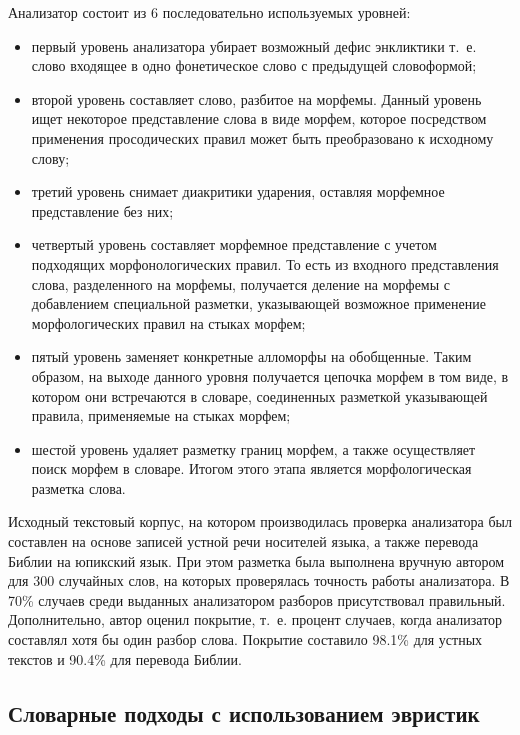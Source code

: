 Анализатор состоит из 6 последовательно используемых уровней:
\begin{itemize}
	\item первый уровень анализатора убирает возможный дефис энкликтики т.~е. слово входящее в одно фонетическое слово с предыдущей словоформой;
	\item второй уровень составляет слово, разбитое на морфемы. Данный уровень ищет некоторое представление слова в виде морфем, которое посредством применения просодических правил может быть преобразовано к исходному слову;
	\item третий уровень снимает диакритики ударения, оставляя морфемное представление без них;
	\item четвертый уровень составляет морфемное представление с учетом подходящих морфонологических правил. То есть из входного представления слова, разделенного на морфемы, получается деление на морфемы с добавлением специальной разметки, указывающей возможное применение морфологических правил на стыках морфем;
	\item пятый уровень заменяет конкретные алломорфы на обобщенные. Таким образом, на выходе данного уровня получается цепочка морфем в том виде, в котором они встречаются в словаре, соединенных разметкой указывающей правила, применяемые на стыках морфем;
	\item шестой уровень удаляет разметку границ морфем, а также осуществляет поиск морфем в словаре. Итогом этого этапа является морфологическая разметка слова.
\end{itemize}

Исходный текстовый корпус, на котором производилась проверка анализатора был составлен на основе записей устной речи носителей языка, а также перевода Библии на юпикский язык. При этом разметка была выполнена вручную автором для 300 случайных слов, на которых проверялась точность работы анализатора. В 70\% случаев среди выданных анализатором разборов присутствовал правильный. Дополнительно, автор оценил покрытие, т.~е. процент случаев, когда анализатор составлял хотя бы один разбор слова. Покрытие составило 98.1\% для устных текстов и 90.4\% для перевода Библии.

\subsection{Словарные подходы с использованием эвристик}

